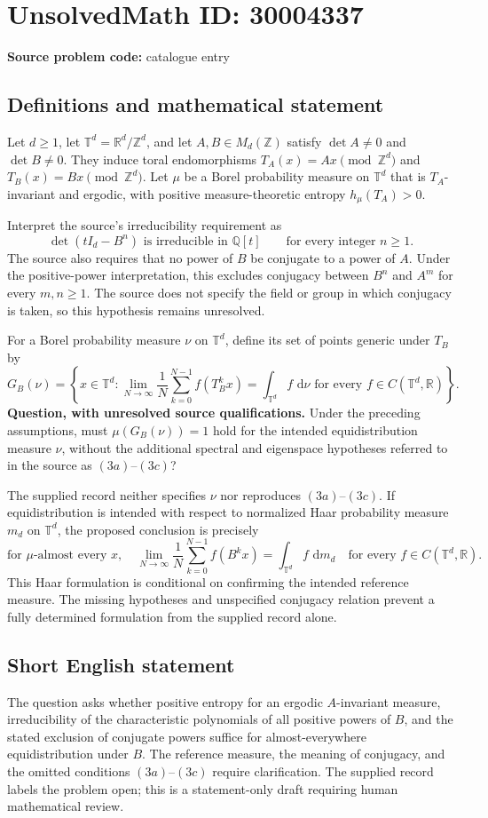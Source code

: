 \documentclass[11pt]{article}
\newcommand{\Z}{\mathbb{Z}}
\newcommand{\Q}{\mathbb{Q}}
\newcommand{\R}{\mathbb{R}}
\newcommand{\dd}{\,\mathrm{d}}
\begin{document}
\section*{UnsolvedMath ID: 30004337}
\textbf{Source problem code:} catalogue entry
\subsection{Definitions and mathematical statement}
Let \(d\geq 1\), let \(\mathbb T^d=\R^d/\Z^d\), and let \(A,B\in M_d(\Z)\) satisfy \(\det A\neq 0\) and \(\det B\neq 0\). They induce toral endomorphisms \(T_A(x)=Ax\pmod{\Z^d}\) and \(T_B(x)=Bx\pmod{\Z^d}\). Let \(\mu\) be a Borel probability measure on \(\mathbb T^d\) that is \(T_A\)-invariant and ergodic, with positive measure-theoretic entropy \(h_\mu(T_A)>0\).

Interpret the source's irreducibility requirement as
\[
\det(tI_d-B^n)\text{ is irreducible in }\Q[t]
\qquad\text{for every integer }n\geq 1.
\]
The source also requires that no power of \(B\) be conjugate to a power of \(A\). Under the positive-power interpretation, this excludes conjugacy between \(B^n\) and \(A^m\) for every \(m,n\geq 1\). The source does not specify the field or group in which conjugacy is taken, so this hypothesis remains unresolved.

For a Borel probability measure \(\nu\) on \(\mathbb T^d\), define its set of points generic under \(T_B\) by
\[
G_B(\nu)=\left\{x\in\mathbb T^d:
\lim_{N\to\infty}\frac1N\sum_{k=0}^{N-1}f(T_B^k x)
=\int_{\mathbb T^d}f\,\dd\nu
\text{ for every }f\in C(\mathbb T^d,\R)\right\}.
\]
\textbf{Question, with unresolved source qualifications.} Under the preceding assumptions, must \(\mu(G_B(\nu))=1\) hold for the intended equidistribution measure \(\nu\), without the additional spectral and eigenspace hypotheses referred to in the source as \((3a)\)--\((3c)\)?

The supplied record neither specifies \(\nu\) nor reproduces \((3a)\)--\((3c)\). If equidistribution is intended with respect to normalized Haar probability measure \(m_d\) on \(\mathbb T^d\), the proposed conclusion is precisely
\[
\text{for }\mu\text{-almost every }x,\quad
\lim_{N\to\infty}\frac1N\sum_{k=0}^{N-1}f(B^k x)
=\int_{\mathbb T^d}f\,\dd m_d
\quad\text{for every }f\in C(\mathbb T^d,\R).
\]
This Haar formulation is conditional on confirming the intended reference measure. The missing hypotheses and unspecified conjugacy relation prevent a fully determined formulation from the supplied record alone.
\subsection{Short English statement}
The question asks whether positive entropy for an ergodic \(A\)-invariant measure, irreducibility of the characteristic polynomials of all positive powers of \(B\), and the stated exclusion of conjugate powers suffice for almost-everywhere equidistribution under \(B\). The reference measure, the meaning of conjugacy, and the omitted conditions \((3a)\)--\((3c)\) require clarification. The supplied record labels the problem open; this is a statement-only draft requiring human mathematical review.
\end{document}
